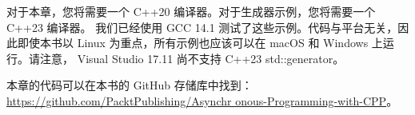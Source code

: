 对于本章，您将需要一个 C++20 编译器。对于生成器示例，您将需要一个 C++23 编译器。
我们已经使用 GCC 14.1 测试了这些示例。代码与平台无关，因此即使本书以 Linux 为重点，所有示例也应该可以在 macOS 和 Windows 上运行。请注意， Visual Studio 17.11 尚不支持 C++23 std::generator。

本章的代码可以在本书的 GitHub 存储库中找到： \url{https://github.com/PacktPublishing/Asynchr onous-Programming-with-CPP}。
